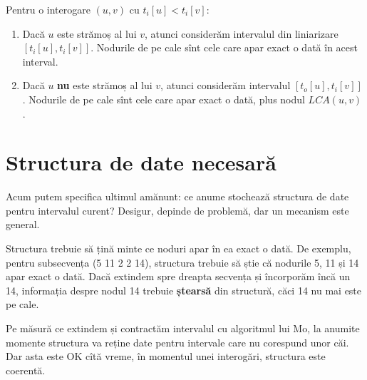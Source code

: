 \documentclass[../main.tex]{subfiles}
\begin{document}
Pentru o interogare $(u,v)$ cu $t_i[u] < t_i[v]$:

\begin{enumerate}
  \item Dacă $u$ este strămoș al lui $v$, atunci considerăm intervalul din liniarizare $[t_i[u], t_i[v]]$. Nodurile de pe cale sînt cele care apar exact o dată în acest interval.

  \item Dacă $u$ \textbf{nu} este strămoș al lui $v$, atunci considerăm intervalul $[t_o[u], t_i[v]]$. Nodurile de pe cale sînt cele care apar exact o dată, plus nodul $LCA(u,v)$.
\end{enumerate}

\section{Structura de date necesară}

Acum putem specifica ultimul amănunt: ce anume stochează structura de date pentru intervalul curent? Desigur, depinde de problemă, dar un mecanism este general.

Structura trebuie să țină minte ce noduri apar în ea exact o dată. De exemplu, pentru subsecvența (5 11 2 2 14), structura trebuie să știe că nodurile 5, 11 și 14 apar exact o dată. Dacă extindem spre dreapta secvența și încorporăm încă un 14, informația despre nodul 14 trebuie \textbf{ștearsă} din structură, căci 14 nu mai este pe cale.

Pe măsură ce extindem și contractăm intervalul cu algoritmul lui Mo, la anumite momente structura va reține date pentru intervale care nu corespund unor căi. Dar asta este OK cîtă vreme, în momentul unei interogări, structura este coerentă.
\end{document}
